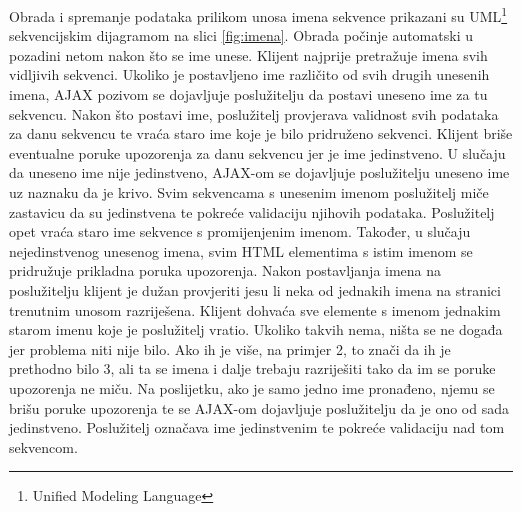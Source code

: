 Obrada i spremanje podataka prilikom unosa imena sekvence prikazani su
UML\footnote{Unified Modeling Language} sekvencijskim dijagramom na slici
\ref{fig:imena}. Obrada počinje automatski u pozadini netom nakon što se ime
unese. Klijent najprije pretražuje imena svih vidljivih sekvenci. Ukoliko je
postavljeno ime različito od svih drugih unesenih imena, AJAX pozivom se
dojavljuje poslužitelju da postavi uneseno ime za tu sekvencu. Nakon što postavi
ime, poslužitelj provjerava validnost svih podataka za danu sekvencu te vraća
staro ime koje je bilo pridruženo sekvenci. Klijent briše eventualne poruke
upozorenja za danu sekvencu jer je ime jedinstveno. U slučaju da uneseno ime
nije jedinstveno, AJAX-om se dojavljuje poslužitelju uneseno ime uz naznaku da
je krivo. Svim sekvencama s unesenim imenom poslužitelj miče zastavicu da su
jedinstvena te pokreće validaciju njihovih podataka. Poslužitelj opet vraća staro
ime sekvence s promijenjenim imenom. Također, u slučaju nejedinstvenog unesenog
imena, svim HTML elementima s istim imenom se pridružuje prikladna poruka
upozorenja. Nakon postavljanja imena na poslužitelju klijent je dužan
provjeriti jesu li neka od jednakih imena na stranici trenutnim unosom
razriješena. Klijent dohvaća sve elemente s imenom jednakim starom imenu koje
je poslužitelj vratio. Ukoliko takvih nema, ništa se ne događa jer problema niti
nije bilo. Ako ih je više, na primjer 2, to znači da ih je prethodno bilo 3, ali
ta se imena i dalje trebaju razriješiti tako da im se poruke upozorenja ne miču.
Na poslijetku, ako je samo jedno ime pronađeno, njemu se brišu poruke upozorenja
te se AJAX-om dojavljuje poslužitelju da je ono od sada jedinstveno. Poslužitelj
označava ime jedinstvenim te pokreće validaciju nad tom sekvencom.


